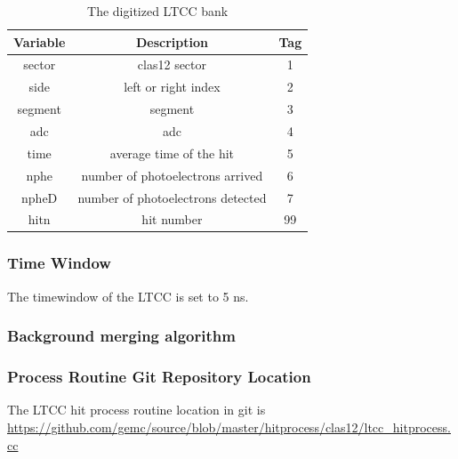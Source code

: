 \begin{table}
	\begin{center}
		\begin{tabular}{| c | c | c |}
			\hline \hline
			Variable    & Description                                        & Tag  \\
			\hline
             sector  &                                     clas12 sector  &    1 \\
               side  &                               left or right index  &    2 \\
            segment  &                                           segment  &    3 \\
                adc  &                                               adc  &    4 \\
               time  &                           average time of the hit  &    5 \\
               nphe  &                  number of photoelectrons arrived  &    6 \\
              npheD  &                 number of photoelectrons detected  &    7 \\
               hitn  &                                        hit number  &   99 \\
			\hline \hline
		\end{tabular}
	\end{center}
	\caption{The digitized LTCC bank}\label{tab:ltccBank}
\end{table}

\subsubsection{Time Window}
The timewindow of the LTCC is set to 5 ns.


\subsubsection{Background merging algorithm}

\subsubsection{Process Routine Git Repository Location}
The LTCC hit process routine location in git is \url{https://github.com/gemc/source/blob/master/hitprocess/clas12/ltcc_hitprocess.cc}
